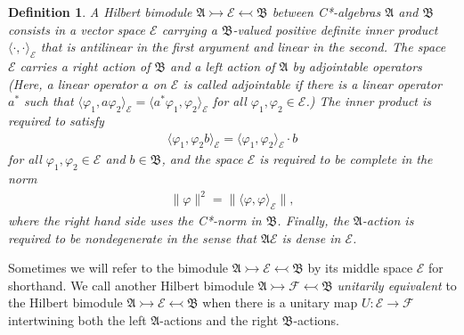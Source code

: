 \documentclass[sn-mathphys,Numbered]{sn-jnl}
\newtheorem{definition}{Definition}%
\providecommand{\norm}[1]{\lVert#1\rVert}
\providecommand{\inner}[2]{\langle#1,#2\rangle}
\begin{document}
\begin{definition}
A \emph{Hilbert bimodule} $\mathfrak{A}\rightarrowtail\mathcal{E}\leftarrowtail\mathfrak{B}$ between C*-algebras $\mathfrak{A}$ and $\mathfrak{B}$ consists in a vector space $\mathcal{E}$ carrying a $\mathfrak{B}$-valued positive definite inner product $\inner{\cdot}{\cdot}_\mathcal{E}$ that is antilinear in the first argument and linear in the second.  The space $\mathcal{E}$ carries a right action of $\mathfrak{B}$ and a left action of $\mathfrak{A}$ by adjointable operators (Here, a linear operator $a$ on $\mathcal{E}$ is called \emph{adjointable} if there is a linear operator $a^*$ such that $\inner{\varphi_1}{a\varphi_2}_{\mathcal{E}} = \inner{a^*\varphi_1}{\varphi_2}_{\mathcal{E}}$ for all $\varphi_1,\varphi_2\in\mathcal{E}$.)  The inner product is required to satisfy
\begin{align}
    \inner{\varphi_1}{\varphi_2b}_\mathcal{E} = \inner{\varphi_1}{\varphi_2}_\mathcal{E}\cdot b
\end{align}
for all $\varphi_1,\varphi_2\in\mathcal{E}$ and $b\in\mathfrak{B}$, and the space $\mathcal{E}$ is required to be complete in the norm
\begin{align}
    \norm{\varphi}^2 = \norm{\inner{\varphi}{\varphi}_{\mathcal{E}}},
\end{align}
where the right hand side uses the C*-norm in $\mathfrak{B}$.  Finally, the $\mathfrak{A}$-action is required to be nondegenerate in the sense that $\mathfrak{A}\mathcal{E}$ is dense in $\mathcal{E}$.
\end{definition}\bigskip

\noindent Sometimes we will refer to the bimodule $\mathfrak{A}\rightarrowtail\mathcal{E}\leftarrowtail\mathfrak{B}$ by its middle space $\mathcal{E}$ for shorthand.  We call another Hilbert bimodule $\mathfrak{A}\rightarrowtail\mathcal{F}\leftarrowtail\mathfrak{B}$ \emph{unitarily equivalent} to the Hilbert bimodule $\mathfrak{A}\rightarrowtail\mathcal{E}\leftarrowtail\mathfrak{B}$ when there is a unitary map $U: \mathcal{E}\to\mathcal{F}$ intertwining both the left $\mathfrak{A}$-actions and the right $\mathfrak{B}$-actions.
\end{document}
